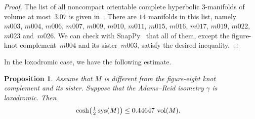 \documentclass[11pt,reqno]{amsart}
\newtheorem{proposition}[theorem]{Proposition}
\theoremstyle{definition}
\numberwithin{equation}{section}
\DeclareMathOperator{\vol}{{\rm vol}}
\DeclareMathOperator{\sys}{{\rm sys}}
\numberwithin{equation}{section}
\begin{document}
\begin{proof}
The list of all noncompact orientable complete hyperbolic $3$-manifolds of volume at most~$3.07$ is given in~\cite{GHMTY}.
There are $14$ manifolds in this list, namely $m003$, $m004$, $m006$, $m007$, $m009$, $m010$, $m011$, $m015$, $m016$, $m017$, $m019$, $m022$, $m023$ and~$m026$.
We can check with SnapPy~\cite{snappy} that all of them, except the figure-knot complement~$m004$ and its sister~$m003$, satisfy the desired inequality.
\end{proof}

In the loxodromic case, we have the following estimate.

\begin{proposition} \label{prop:ARloxodromic}
Assume that $M$ is different from the figure-eight knot complement and its sister.
Suppose that the Adams--Reid isometry $\gamma$ is loxodromic.
Then
\[
\cosh \!\left(\tfrac{1}{2} \sys(M) \right) \leq 0.44647 \, \vol(M).
\]
\end{proposition}
\end{document}
